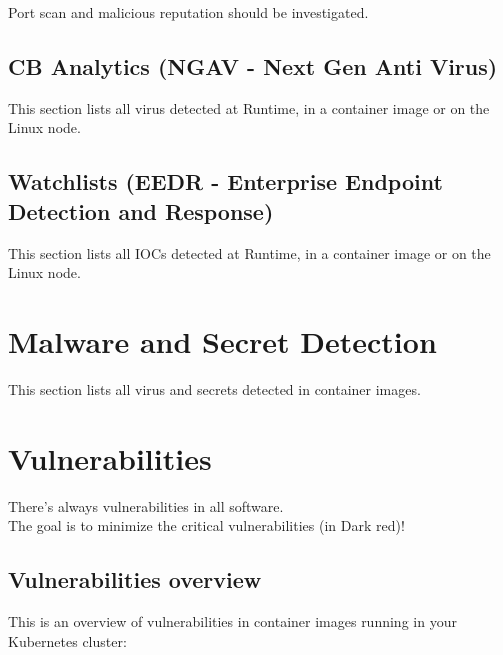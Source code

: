 \begin{importantblock}
	Port scan and malicious reputation should be investigated.
\end{importantblock}

\vskip10pt


\vskip10pt


\subsection{CB Analytics (NGAV - Next Gen Anti Virus)}
This section lists all virus detected at Runtime, in a container image or on the Linux node.

\subsection{Watchlists (EEDR - Enterprise Endpoint Detection and Response)}
This section lists all IOCs detected at Runtime, in a container image or on the Linux node.


\section{Malware and Secret Detection}
This section lists all virus and secrets detected in container images.



\section{Vulnerabilities}
There's always vulnerabilities in all software.\\
The goal is to minimize the critical vulnerabilities (in Dark red)!



\subsection{Vulnerabilities overview}
This is an overview of vulnerabilities in container images running in your Kubernetes cluster:

